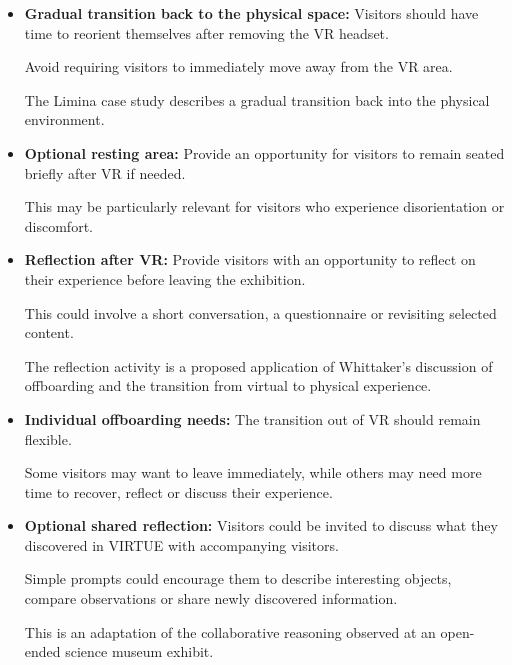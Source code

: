 \begin{itemize}

    \item \textbf{Gradual transition back to the physical space:}
    Visitors should have time to reorient themselves
    after removing the VR headset.

    Avoid requiring visitors to immediately move away
    from the VR area.

    The Limina case study describes a gradual transition
    back into the physical environment.
    \cite[p.~91]{whittaker_onboarding_2025}

    \item \textbf{Optional resting area:}
    Provide an opportunity for visitors to remain seated
    briefly after VR if needed.

    This may be particularly relevant for visitors who
    experience disorientation or discomfort.
    \cite[pp.~91--92]{whittaker_onboarding_2025}

    \item \textbf{Reflection after VR:}
    Provide visitors with an opportunity to reflect on
    their experience before leaving the exhibition.

    This could involve a short conversation, a
    questionnaire or revisiting selected content.

    The reflection activity is a proposed application
    of Whittaker's discussion of offboarding and
    the transition from virtual to physical experience.
    \cite[pp.~97--98]{whittaker_onboarding_2025}

    \item \textbf{Individual offboarding needs:}
    The transition out of VR should remain flexible.

    Some visitors may want to leave immediately,
    while others may need more time to recover,
    reflect or discuss their experience.
    \cite[pp.~98--103]{whittaker_onboarding_2025}

    \item \textbf{Optional shared reflection:}
    Visitors could be invited to discuss what they
    discovered in VIRTUE with accompanying visitors.

    Simple prompts could encourage them to describe
    interesting objects, compare observations or
    share newly discovered information.

    This is an adaptation of the collaborative reasoning
    observed at an open-ended science museum exhibit.
    \cite[pp.~721--723]{franse_families_2021}


\end{itemize}
